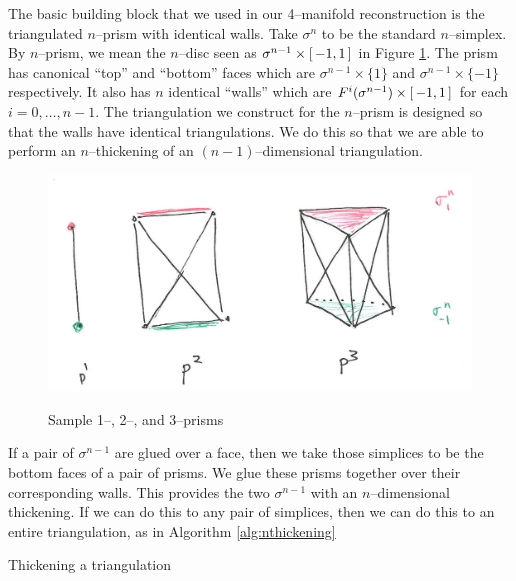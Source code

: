 The basic building block that we used in our 4--manifold reconstruction is the triangulated $n$--prism with identical walls.
Take $\sigma^n$ to be the standard $n$--simplex.
By $n$--prism, we mean the $n$--disc seen as $\sigma^{n-1}\times [\,-1,1\,]$ in Figure \ref{fig:nprism}.
The prism has canonical ``top'' and ``bottom'' faces which are $\sigma^{n-1}\times \{1\}$ and $\sigma^{n-1}\times \{-1\}$ respectively.
It also has $n$ identical ``walls'' which are $F^i(\sigma^{n-1})\times [\,-1,1\,]$ for each $i=0,\dots,n-1$.
The triangulation we construct for the $n$--prism is designed so that the walls have identical triangulations.
We do this so that we are able to perform an $n$--thickening of an $(n-1)$--dimensional triangulation.

\begin{figure}
	\centering
	\captionsetup{justification=centering}
	\caption{Sample 1--, 2--, and 3--prisms}
	\includegraphics[width = 5.5in]{figures/nprism.jpg}
	\label{fig:nprism}
\end{figure}

If a pair of $\sigma^{n-1}$ are glued over a face, then we take those simplices to be the bottom faces of a pair of prisms.
We glue these prisms together over their corresponding walls.
This provides the two $\sigma^{n-1}$ with an $n$--dimensional thickening.
If we can do this to any pair of simplices, then we can do this to an entire triangulation, as in Algorithm \ref{alg:nthickening}

\begin{algorithm}[h]
	\caption{Thickening a triangulation}
	\label{alg:nthickening}
\end{algorithm}

